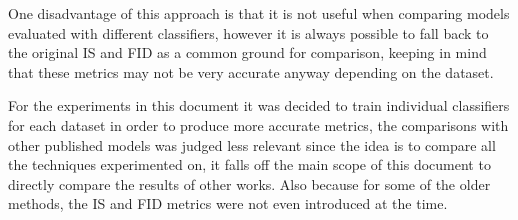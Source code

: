 One disadvantage of this approach is that it is not useful when comparing models evaluated with different classifiers, however it is always possible to fall back to the original \gls{IS} and \gls{FID} as a common ground for comparison, keeping in mind that these metrics may not be very accurate anyway depending on the dataset.

For the experiments in this document it was decided to train individual classifiers for each dataset in order to produce more accurate metrics, the comparisons with other published models was judged less relevant since the idea is to compare all the techniques experimented on, it falls off the main scope of this document to directly compare the results of other works. Also because for some of the older methods, the \gls{IS} and \gls{FID} metrics were not even introduced at the time.
